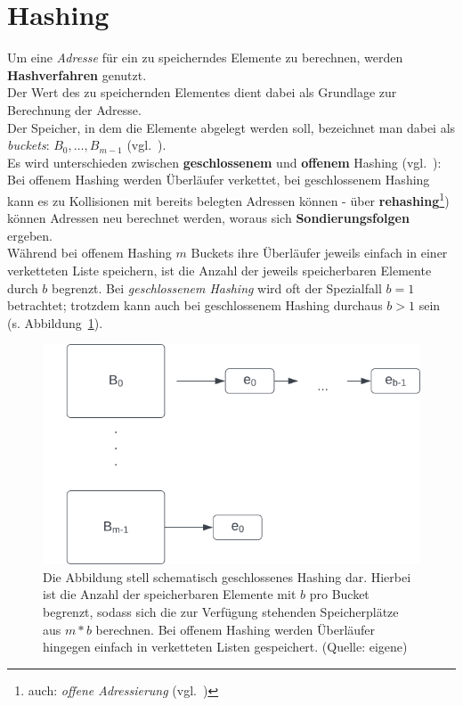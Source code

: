 \section{Hashing}
Um eine \textit{Adresse} für ein zu speicherndes Elemente zu berechnen, werden \textbf{Hashverfahren} genutzt.\\
Der Wert des zu speichernden Elementes dient dabei als Grundlage zur Berechnung der Adresse.\\
Der Speicher, in dem die Elemente abgelegt werden soll, bezeichnet man dabei als \textit{buckets}: $B_0,\dots , B_{m - 1}$ (vgl.~\cite[115]{GD18d}).\\

\noindent
Es wird unterschieden zwischen \textbf{geschlossenem} und \textbf{offenem} Hashing (vgl.~\cite[116]{GD18d}): Bei offenem Hashing werden Überläufer verkettet, bei geschlossenem Hashing kann es zu Kollisionen mit bereits belegten Adressen können - über \textbf{rehashing}\footnote{
auch: \textit{offene Adressierung} (vgl.~\cite[119]{GD18d})
}) können Adressen neu berechnet werden, woraus sich \textbf{Sondierungsfolgen} ergeben.\\

\noindent
Während bei offenem Hashing $m$ Buckets ihre Überläufer jeweils einfach in einer verketteten Liste speichern, ist die Anzahl der jeweils speicherbaren Elemente durch $b$ begrenzt.
Bei \textit{geschlossenem Hashing} wird oft der Spezialfall $b = 1$ betrachtet; trotzdem kann auch bei geschlossenem Hashing durchaus $b > 1$ sein (s. Abbildung~\ref{fig:openaddressing}).\\

\begin{figure}
\begin{center}
\includegraphics[scale=0.4]{chapters/Datenstrukturen und Algorithmen/img/openaddressing}
\caption{Die Abbildung stell schematisch geschlossenes Hashing dar. Hierbei ist die Anzahl der speicherbaren Elemente mit $b$ pro Bucket begrenzt, sodass sich die zur Verfügung stehenden Speicherplätze aus $m * b$ berechnen. Bei offenem Hashing werden Überläufer hingegen einfach in verketteten Listen gespeichert. (Quelle: eigene)}
\label{fig:openaddressing}
\end{center}
\end{figure}

